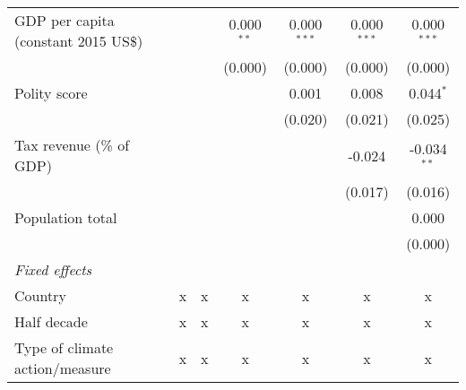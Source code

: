 \begin{tabular}{lcccccc}
   GDP per capita (constant 2015 US\$)                                                                &         &                & 0.000$^{**}$   & 0.000$^{***}$  & 0.000$^{***}$  & 0.000$^{***}$\\   
                                                                                                      &         &                & (0.000)        & (0.000)        & (0.000)        & (0.000)\\   
   Polity score                                                                                       &         &                &                & 0.001          & 0.008          & 0.044$^{*}$\\   
                                                                                                      &         &                &                & (0.020)        & (0.021)        & (0.025)\\   
   Tax revenue (\% of GDP)                                                                            &         &                &                &                & -0.024         & -0.034$^{**}$\\   
                                                                                                      &         &                &                &                & (0.017)        & (0.016)\\   
   Population total                                                                                   &         &                &                &                &                & 0.000\\   
                                                                                                      &         &                &                &                &                & (0.000)\\   
   \emph{Fixed effects}\\
   Country                                                                                            & x       & x              & x              & x              & x              & x\\  
   Half decade                                                                                        & x       & x              & x              & x              & x              & x\\  
   Type of climate action/measure                                                                     & x       & x              & x              & x              & x              & x\\  

\end{tabular}
